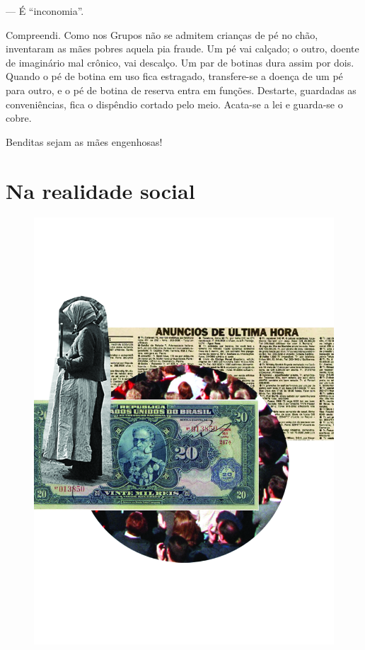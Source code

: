 --- É ``inconomia''.

Compreendi. Como nos Grupos não se admitem crianças de pé no chão,
inventaram as mães pobres aquela pia fraude. Um pé vai calçado; o outro,
doente de imaginário mal crônico, vai descalço. Um par de botinas dura
assim por dois. Quando o pé de botina em uso fica estragado,
transfere-se a doença de um pé para outro, e o pé de botina de reserva
entra em funções. Destarte, guardadas as conveniências, fica o dispêndio
cortado pelo meio. Acata-se a lei e guarda-se o cobre.

Benditas sejam as mães engenhosas!

\part{Na realidade social}

\pagebreak
\thispagestyle{empty}
\begin{figure}
\vspace*{-.5cm}
\hspace*{-2.3cm}\includegraphics[width=140mm]{../ilustracoes/05_DONA.jpg}
\end{figure}
\pagebreak

